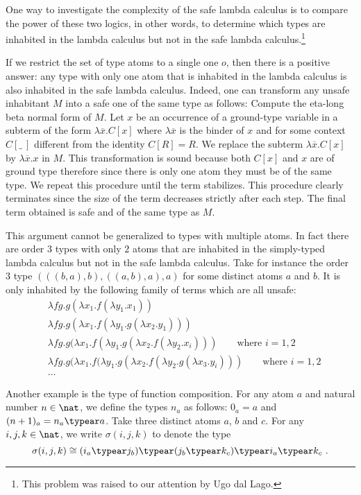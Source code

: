 One way to investigate the complexity of the safe lambda calculus is
to compare the power of these two logics, in other words, to
determine which types are inhabited in the lambda calculus but not
in the safe lambda calculus.\footnote{This problem was raised to our
attention by Ugo dal Lago.}

If we restrict the set of type atoms to a single one $o$, then there
is a positive answer: any type with only one atom that is inhabited
in the lambda calculus is also inhabited in the safe lambda
calculus. Indeed, one can transform any unsafe inhabitant $M$ into a
safe one of the same type as follows: Compute the eta-long beta
normal form of $M$. Let $x$ be an occurrence of a ground-type
variable in a subterm of the form $\lambda \overline{x} . C[x]$
where $\lambda \overline{x}$ is the binder of $x$ and for some
context $C[\_~]$ different from the identity $C[R]=R$. We replace
the subterm $\lambda \overline{x} . C[x]$ by $\lambda \overline{x}.
x$ in $M$. This transformation is sound because both $C[x]$ and $x$
are of ground type therefore since there is only one atom they must
be of the same type. We repeat this procedure until the term
stabilizes. This procedure clearly terminates since the size of the
term decreases strictly after each step. The final term obtained is
safe and of the same type as $M$.

This argument cannot be generalized to types with multiple atoms. In fact there are order $3$ types with only $2$ atoms that are inhabited in the simply-typed lambda calculus but not in the safe lambda calculus. Take for instance the order $3$ type
 $( ((b, a), b),  ((a, b), a),  a)$ for some distinct atoms $a$ and $b$. It is only inhabited by the following family of terms which are all unsafe:
 \begin{align*}
& \lambda f g . g (\lambda x_1 . f (\lambda y_1 . x_1)) \\
&\lambda f g . g (\lambda x_1 . f (\lambda y_1 . g (\lambda x_2 . y_1))) \\
&\lambda f g . g (\lambda x_1 . f (\lambda y_1 . g (\lambda x_2 . f (\lambda y_2 . x_i))) \qquad\mbox{where $i = 1, 2$} \\
&\lambda f g . g (\lambda x_1 . f (\lambda y_1 . g (\lambda x_2 . f (\lambda y_2 . g (\lambda x_3 . y_i))) \qquad\mbox{where $i = 1, 2$} \\
&\ldots
\end{align*}

Another example is the type of function composition. For any atom
$a$ and natural number $n\in\nat$, we define the types $n_a$ as
follows: $0_a = a$ and $(n+1)_a = n_a \typear a$. Take three
distinct atoms $a$, $b$ and $c$. For any $i,j,k\in\nat$, we write
$\sigma(i,j,k)$ to denote the type
$$\sigma(i,j,k) \cong (i_a \typear j_b) \typear (j_b \typear k_c) \typear i_a \typear
k_c \ .$$

